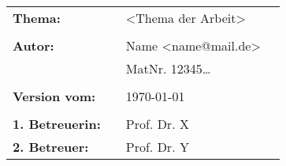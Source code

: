 \begin{flushleft}
    \begin{tabular}{llll}
        \textbf{Thema:}         &  & <Thema der Arbeit>   & \\
                                &  &                        \\
        \textbf{Autor:}         &  & Name <name@mail.de>  & \\
                                &  & MatNr. 12345\ldots{} & \\
                                &  &                        \\
        \textbf{Version vom:}   &  & \today{}             & \\
                                &  &                        \\
        \textbf{1. Betreuerin:} &  & Prof. Dr. X          & \\
        \textbf{2. Betreuer:}   &  & Prof. Dr. Y          & \\
    \end{tabular}
\end{flushleft}
